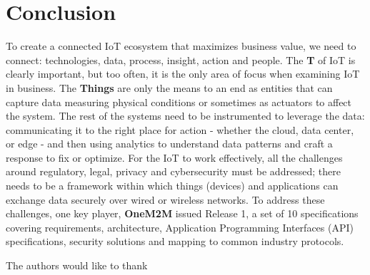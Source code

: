 \documentclass[sigconf]{acmart}
\begin{document}
\section{Conclusion}

To create a connected IoT ecosystem that maximizes business value, we need to connect: technologies, data, process, insight, action and people. The \textbf{T} of IoT is clearly important, but too often, it is the only area of focus when examining IoT in business. The \textbf{Things} are only the means to an end as entities that can capture data measuring physical conditions or sometimes as actuators to affect the system. The rest of the systems need to be instrumented to leverage the data: communicating it to the right place for action - whether the cloud, data center, or edge - and then using analytics to understand data patterns and craft a response to fix or optimize. For the IoT to work effectively, all the challenges around regulatory, legal, privacy and cybersecurity must be addressed; there needs to be a framework within which things (devices) and applications can exchange data securely over wired or wireless networks. To address these challenges, one key player, \textbf{OneM2M} issued Release 1, a set of 10 specifications covering requirements, architecture, Application Programming Interfaces (API) specifications, security solutions and mapping to common industry protocols.

\begin{acks}

  The authors would like to thank 

\end{acks}


 
\end{document}
